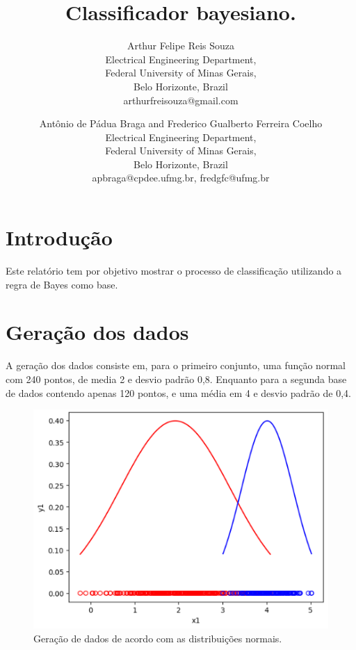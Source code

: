\documentclass{article}
\begin{document}
\title{Classificador bayesiano.}

\author{Arthur Felipe Reis Souza \\
Electrical Engineering Department, \\
Federal University of Minas Gerais, \\
Belo Horizonte, Brazil \\
arthurfreisouza@gmail.com \\
\and
Antônio de Pádua Braga and Frederico Gualberto Ferreira Coelho \\
Electrical Engineering Department, \\
Federal University of Minas Gerais, \\
Belo Horizonte, Brazil \\
apbraga@cpdee.ufmg.br, fredgfc@ufmg.br
}

\maketitle

\begin{abstract}
\end{abstract}

\section{Introdução}

Este relatório tem por objetivo mostrar o processo de classificação utilizando a regra de Bayes como base.

\section{Geração dos dados}

A geração dos dados consiste em, para o primeiro conjunto, uma função normal com 240 pontos, de media 2 e desvio padrão 0,8. Enquanto para a segunda base de dados contendo apenas 120 pontos, e uma média em 4 e desvio padrão de 0,4.

\begin{figure}[h]
    \centering
    \includegraphics[width=0.5\linewidth]{generation_bayes.png}
    \caption{Geração de dados de acordo com as distribuições normais.}
    \label{fig:kernel_types}
 \end{figure}
\end{document}
